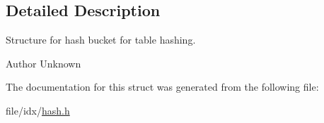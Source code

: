 \subsection{Detailed Description}
Structure for hash bucket for table hashing. 

\begin{DoxyAuthor}{Author}
Unknown 
\end{DoxyAuthor}


The documentation for this struct was generated from the following file\+:\begin{DoxyCompactItemize}
\item 
file/idx/\hyperlink{hash_8h}{hash.\+h}\end{DoxyCompactItemize}
